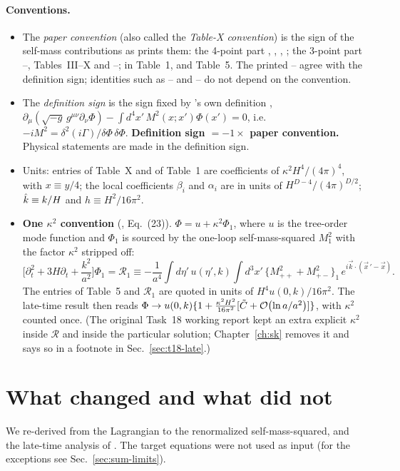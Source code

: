 \paragraph{Conventions.}
\begin{itemize}[leftmargin=14pt,itemsep=1pt]
\item The \emph{paper convention} (also called the \emph{Table-X convention}) is the sign of the self-mass contributions as \PI{} prints them:
the 4-point part , , , ; the 3-point part --, Tables~III--X and --; in \PII{}
Table~1,  and Table~5. The printed -- agree with the definition sign; identities such as -- and
-- do not depend on the convention.
\item The \emph{definition sign} is the sign fixed by \PI's own definition ,
$\partial_\mu(\sqrt{-g}\,g^{\mu\nu}\partial_\nu\Phi)-\int d^4x'\,M^2(x;x')\Phi(x')=0$, i.e.\ $-iM^2=\delta^2(i\Gamma)/\delta\Phi\,\delta\Phi$.
\textbf{Definition sign $=-1\times$ paper convention.} Physical statements are made in the definition sign.
\item Units: entries of Table~X and of \PII{} Table~1 are coefficients of $\kappa^2H^4/(4\pi)^4$, with $x\equiv y/4$; the local coefficients
$\beta_i$ and $\alpha_i$ are in units of $H^{D-4}/(4\pi)^{D/2}$; $\hat k\equiv k/H$ and $h\equiv H^2/16\pi^2$.
\item \textbf{One $\kappa^2$ convention} (\PII, Eq.~(23)). $\Phi=u+\kappa^2\Phi_1$, where $u$ is the tree-order mode function and $\Phi_1$ is sourced by the
one-loop self-mass-squared $M^2_1$ with the factor $\kappa^2$ stripped off:
\[
\Big[\partial_t^2+3H\partial_t+\frac{k^2}{a^2}\Big]\Phi_1=\mathcal R_1\equiv-\frac1{a^4}\int d\eta'\,u(\eta',k)\int d^3x'\,\big\{M^2_{++}+M^2_{+-}\big\}_1\,
e^{i\vec k\cdot(\vec x\,'-\vec x)} .
\]
The entries of Table~5 and $\mathcal R_1$ are quoted in units of $H^4u(0,k)/16\pi^2$. The late-time result then reads
$\Phi\to u(0,k)\{1+\frac{\kappa^2H^2}{16\pi^2}[\tilde C+\mathcal{O}\!\left(\ln a/a^2\right)]\}$, with $\kappa^2$ counted once.
(The original Task~18 working report kept an extra explicit $\kappa^2$ inside $\mathcal R$ and inside the particular solution; Chapter~\ref{ch:sk}
removes it and says so in a footnote in Sec.~\ref{sec:t18-late}.)
\end{itemize}

\section{What changed and what did not}
\label{sec:sum-overview}
We re-derived \PI{} from the Lagrangian to the renormalized self-mass-squared, and the late-time analysis of \PII. The target equations were not used
as input (for the exceptions see Sec.~\ref{sec:sum-limits}).

